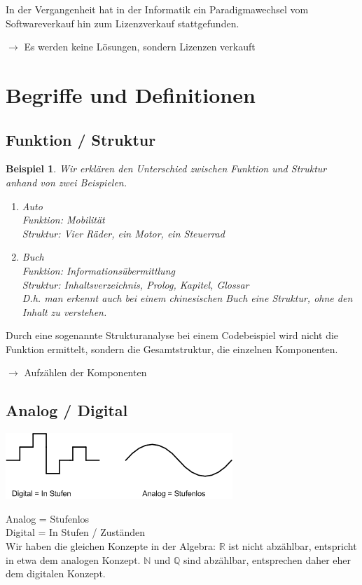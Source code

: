 \documentclass{report}
\newtheorem{myexample}{Beispiel}
\begin{document}
In der Vergangenheit hat in der Informatik ein Paradigmawechsel vom Softwareverkauf hin zum Lizenzverkauf stattgefunden.
\begin{center}$\to$ Es werden keine Lösungen, sondern Lizenzen verkauft\end{center}
\section{Begriffe und Definitionen}
\subsection{Funktion / Struktur}
\begin{myexample}Wir erklären den Unterschied zwischen Funktion und Struktur anhand von zwei Beispielen.
\begin{enumerate}
\item Auto\\
Funktion: Mobilität\\
Struktur: Vier Räder, ein Motor, ein Steuerrad
\item Buch\\
Funktion: Informationsübermittlung\\
Struktur: Inhaltsverzeichnis, Prolog, Kapitel, Glossar\\
D.h. man erkennt auch bei einem chinesischen Buch eine Struktur, ohne den Inhalt zu verstehen.
\end{enumerate}
\end{myexample}
Durch eine sogenannte Strukturanalyse bei einem Codebeispiel wird nicht die Funktion ermittelt, sondern die Gesamtstruktur, die einzelnen Komponenten.
\begin{center}$\to$ Aufzählen der Komponenten\end{center}
\subsection{Analog / Digital}
\begin{center}\includegraphics[scale=0.5]{img/analog-digital.png}\end{center}
Analog = Stufenlos\\
Digital = In Stufen / Zuständen\\
Wir haben die gleichen Konzepte in der Algebra: $\mathbb{R}$ ist nicht abzählbar, entspricht in etwa dem analogen Konzept. $\mathbb{N}$ und $\mathbb{Q}$ sind abzählbar, entsprechen daher eher dem digitalen Konzept.
\end{document}
